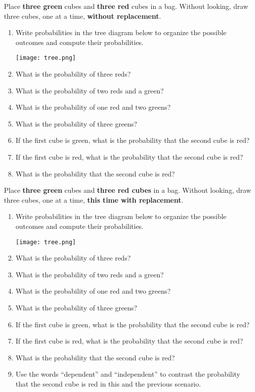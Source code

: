 \documentclass[nooutcomes]{ximera}
\begin{document}
\begin{problem}
Place \textbf{three green} cubes and \textbf{three red} cubes in a bag.  Without looking, draw three cubes, one at a time, \textbf{without replacement}.  
\begin{enumerate}
\item Write probabilities in the tree diagram below to organize the possible outcomes and compute their probabilities.  
\begin{image}
\texttt{[image: tree.png]}
\end{image}
\vspace{.15in}
\item What is the probability of three reds? 
\item What is the probability of two reds and a green? 
\item What is the probability of one red and two greens? 
\item What is the probability of three greens? 
\item If the first cube is green, what is the probability that the second cube is red? 
\item If the first cube is red, what is the probability that the second cube is red? 
\item What is the probability that the second cube is red?  
\end{enumerate}
\end{problem}

\newpage
\begin{problem}
Place \textbf{three green} cubes and \textbf{three red cubes} in a bag.  Without looking, draw three cubes, one at a time, \textbf{this time with replacement}.  
\begin{enumerate}
\item Write probabilities in the tree diagram below to organize the possible outcomes and compute their probabilities.  
\begin{image} 
\texttt{[image: tree.png]}
\end{image}
\vspace{.15in}
\item What is the probability of three reds? 
\item What is the probability of two reds and a green? 
\item What is the probability of one red and two greens? 
\item What is the probability of three greens? 
\item If the first cube is green, what is the probability that the second cube is red? 
\item If the first cube is red, what is the probability that the second cube is red? 
\item What is the probability that the second cube is red?  
\item Use the words ``dependent'' and ``independent'' to contrast the probability that the second cube is red in this and the previous scenario.  
\end{enumerate}
\end{problem}
\end{document}
